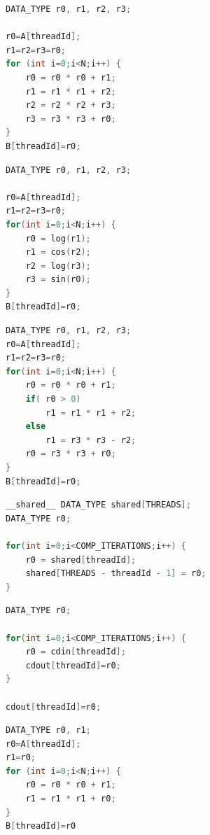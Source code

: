 \noindent\begin{minipage}[!b]{.45\textwidth}
\centering
\begin{lstlisting}[language=C, caption={Int, SP, DP Code}]
DATA_TYPE r0, r1, r2, r3;

r0=A[threadId]; 
r1=r2=r3=r0; 
for (int i=0;i<N;i++) { 
    r0 = r0 * r0 + r1;  
    r1 = r1 * r1 + r2; 
    r2 = r2 * r2 + r3;  
    r3 = r3 * r3 + r0; 
} 
B[threadId]=r0;
\end{lstlisting}
\end{minipage}\hfill
\begin{minipage}[!b]{.45\textwidth}
\centering
\begin{lstlisting}[language=C, caption={SF Code}]
DATA_TYPE r0, r1, r2, r3;

r0=A[threadId]; 
r1=r2=r3=r0; 
for(int i=0;i<N;i++) {  
    r0 = log(r1);  
    r1 = cos(r2);  
    r2 = log(r3);  
    r3 = sin(r0);
} 
B[threadId]=r0;
\end{lstlisting}
\end{minipage}
\noindent\begin{minipage}[!b]{.38\textwidth}
\centering
\begin{lstlisting}[language=C, caption={Branches Code}]
DATA_TYPE r0, r1, r2, r3;
r0=A[threadId]; 
r1=r2=r3=r0; 
for(int i=0;i<N;i++) {  
    r0 = r0 * r0 + r1;  
    if( r0 > 0)
        r1 = r1 * r1 + r2; 
    else 
        r1 = r3 * r3 - r2; 
    r0 = r3 * r3 + r0; 
} 
B[threadId]=r0;
\end{lstlisting}
\end{minipage}\hfill
\begin{minipage}[!b]{.57\textwidth}
\centering
\begin{lstlisting}[language=C, caption={Shared Memory Code}]
__shared__ DATA_TYPE shared[THREADS]; 
DATA_TYPE r0; 

for(int i=0;i<COMP_ITERATIONS;i++) {  
    r0 = shared[threadId];      
    shared[THREADS - threadId - 1] = r0;
}
\end{lstlisting}
\end{minipage}
\noindent\begin{minipage}[!b]{.5\textwidth}
\centering
\begin{lstlisting}[language=C, caption={L2 Cache Code}]
DATA_TYPE r0;

for(int i=0;i<COMP_ITERATIONS;i++) {      
    r0 = cdin[threadId];      
    cdout[threadId]=r0;
} 

cdout[threadId]=r0;
\end{lstlisting}
\end{minipage}\hfill
\begin{minipage}[!b]{.43\textwidth}
\centering
\begin{lstlisting}[language=C, caption={DRAM Code}]
DATA_TYPE r0, r1;
r0=A[threadId]; 
r1=r0; 
for (int i=0;i<N;i++) {  
    r0 = r0 * r0 + r1;  
    r1 = r1 * r1 + r0; 
} 
B[threadId]=r0
\end{lstlisting}
\end{minipage}



